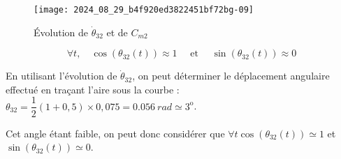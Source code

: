 \else
\fi

\ifprof
\else
\begin{figure}[!h]
\centering
\texttt{[image: 2024\_08\_29\_b4f920ed3822451bf72bg-09]}
\caption{\label{fig_10} Évolution de $\dot{\theta}_{32}$ et de $C_{m 2}$}
\end{figure}
\fi

$$
\forall t, \quad \cos \left(\theta_{32}(t)\right) \approx 1 \quad \text { et } \quad \sin \left(\theta_{32}(t)\right) \approx 0
$$
\ifprof
\begin{corrige}
En utilisant l'évolution de $\dot{\theta}_{32}$, on peut déterminer le déplacement angulaire effectué en traçant l'aire sous la courbe :
$\theta_{32}=\dfrac{1}{2}\left( 1+0,5\right)\times 0,075 =\SI{0,056}{rad}\simeq 3^{\text{o}}$.

Cet angle étant faible, on peut donc considérer que $\forall t \cos \left(\theta_{32}(t)\right)\simeq 1$ et $\sin\left(\theta_{32}(t)\right)\simeq 0$.
\end{corrige}
\else
\fi


